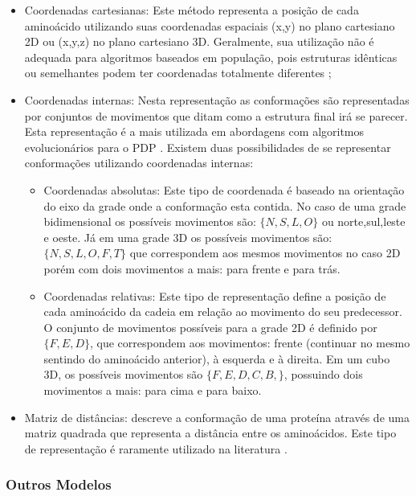 \begin{itemize}
	\item Coordenadas cartesianas: Este método  representa a posição de cada aminoácido utilizando suas coordenadas espaciais (x,y) no plano cartesiano 2D ou (x,y,z) no plano cartesiano 3D. Geralmente, sua utilização não é adequada para algoritmos baseados em população, pois estruturas idênticas ou semelhantes podem ter coordenadas totalmente diferentes  \cite{benitez2015algoritmo}; 
	\item Coordenadas internas: Nesta representação as conformações são representadas por conjuntos de movimentos que ditam como a estrutura final irá se parecer. Esta representação é a mais utilizada em abordagens com algoritmos evolucionários para o PDP \cite{benitez2015algoritmo}. Existem duas possibilidades de se representar conformações utilizando coordenadas internas:
	\begin{itemize}
		\item Coordenadas absolutas: Este tipo de coordenada é baseado na orientação do eixo da grade onde a conformação esta contida. No caso de uma grade bidimensional os possíveis movimentos são: $\{N,S,L,O\}$ ou norte,sul,leste e oeste. Já em uma grade 3D os possíveis movimentos são: $\{N,S,L,O,F,T\}$ que correspondem aos mesmos movimentos no caso 2D porém com dois movimentos a mais: para frente e para trás.
		\item Coordenadas relativas: Este tipo de representação define a posição de cada aminoácido da cadeia em relação ao movimento do seu predecessor. O conjunto de movimentos possíveis para a grade 2D é definido por $\{F,E,D\}$, que correspondem aos movimentos: frente (continuar no mesmo sentindo do aminoácido anterior), à esquerda e à direita. Em um cubo 3D, os possíveis movimentos são $\{F,E,D,C,B,\}$, possuindo dois movimentos a mais: para cima e para baixo. 
	\end{itemize}
	\item Matriz de distâncias: descreve a conformação de uma proteína através de uma matriz quadrada que representa a distância entre os aminoácidos. Este tipo de representação é raramente utilizado na literatura \cite{benitez2015algoritmo}.
\end{itemize}



\subsubsection{Outros Modelos}


